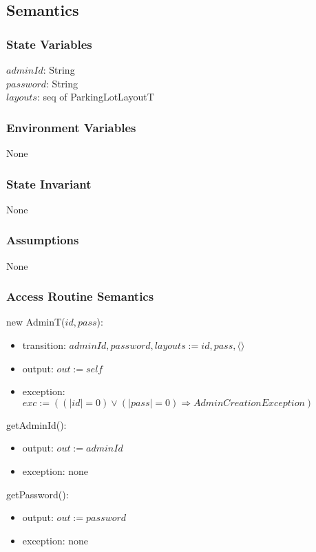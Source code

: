 \documentclass[12pt, titlepage]{article}
\begin{document}
\subsection{Semantics}

\subsubsection{State Variables}
$adminId$: String \\
$password$: String \\
$layouts$: seq of ParkingLotLayoutT

\subsubsection{Environment Variables}
None

\subsubsection{State Invariant}
None

\subsubsection{Assumptions}
None

\subsubsection{Access Routine Semantics}

\noindent new AdminT($id, pass$):
\begin{itemize}
\item transition: $adminId, password, layouts :=  id, pass, \langle \rangle$
\item output: $out := self$
\item exception: $exc := ((|id| = 0) \vee (|pass| = 0) \Rightarrow
AdminCreationException)$
\end{itemize}

\noindent getAdminId():
\begin{itemize} 
\item output: $out := adminId$
\item exception: none
\end{itemize}

\noindent getPassword():
\begin{itemize} 
\item output: $out := password$
\item exception: none
\end{itemize}
\end{document}
